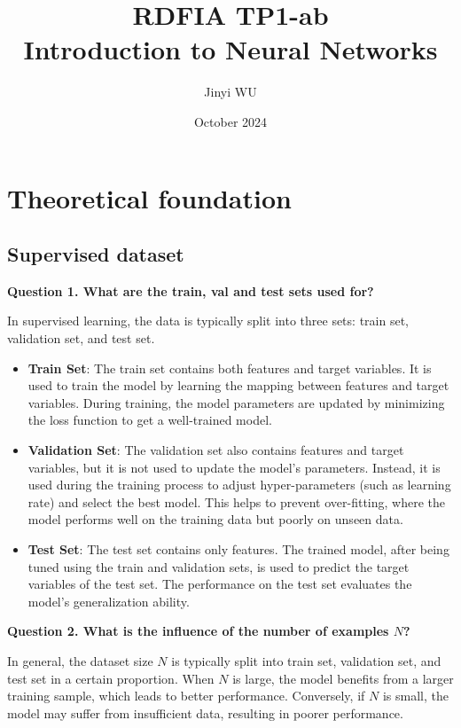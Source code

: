 \documentclass{article}
\title{RDFIA TP1-ab \\ \textbf{Introduction to Neural Networks}}
\author{Jinyi WU}
\date{October 2024}
\begin{document}
\maketitle

\section{Theoretical foundation}
\subsection{Supervised dataset}

\noindent \textbf{Question 1. What are the train, val and test sets used for?}

In supervised learning, the data is typically split into three sets: train set, validation set, and test set.

\begin{itemize}
    \item \textbf{Train Set}: The train set contains both features and target variables. It is used to train the model by learning the mapping between features and target variables. During training, the model parameters are updated by minimizing the loss function to get a well-trained model.
    
    \item \textbf{Validation Set}: The validation set also contains features and target variables, but it is not used to update the model's parameters. Instead, it is used during the training process to adjust hyper-parameters (such as learning rate) and select the best model. This helps to prevent over-fitting, where the model performs well on the training data but poorly on unseen data.
    
    \item \textbf{Test Set}: The test set contains only features. The trained model, after being tuned using the train and validation sets, is used to predict the target variables of the test set. The performance on the test set evaluates the model's generalization ability.
\end{itemize}

\noindent \textbf{Question 2. What is the influence of the number of examples \(N\)?}

In general, the dataset size \(N\) is typically split into train set, validation set, and test set in a certain proportion. When \(N\) is large, the model benefits from a larger training sample, which leads to better performance. Conversely, if \(N\) is small, the model may suffer from insufficient data, resulting in poorer performance.
\end{document}
